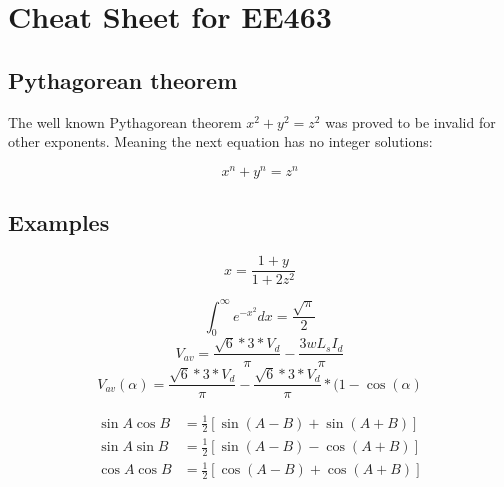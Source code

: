 \documentclass[twocolumn]{article}
\begin{document}
\section{Cheat Sheet for EE463}

\subsection{ Pythagorean theorem}

The well known Pythagorean theorem \(x^2 + y^2 = z^2\) was 
proved to be invalid for other exponents. 
Meaning the next equation has no integer solutions:
 
$$ x^n + y^n = z^n $$


\subsection{ Examples}

$$x=\frac{1+y}{1+2z^2}$$

$$\int_0^\infty e^{-x^2} dx=\frac{\sqrt{\pi}}{2}$$
$$V_{av}=\frac{\sqrt{6}*3*V_{d}}{\pi }-\frac{3wL_{s}I_{d}}{\pi }$$
$$V_{av}(\alpha)=\frac{\sqrt{6}*3*V_{d}}{\pi }-\frac{\sqrt{6}*3*V_{d}}{\pi }*(1-\cos(\alpha)$$

\begin{align*}
          \sin A \cos B &= \frac{1}{2}\left[ \sin(A-B)+\sin(A+B) \right] \\
          \sin A \sin B &= \frac{1}{2}\left[ \sin(A-B)-\cos(A+B) \right] \\
          \cos A \cos B &= \frac{1}{2}\left[ \cos(A-B)+\cos(A+B) \right] \\         
\end{align*}
\end{document}
